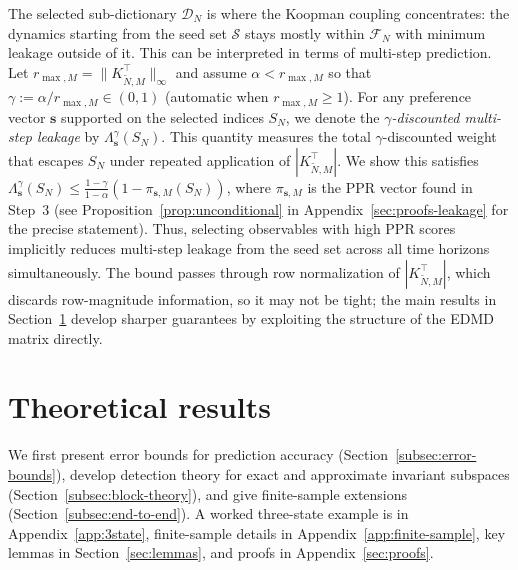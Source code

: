 \documentclass{article}
\theoremstyle{plain}
\theoremstyle{definition}
\def\tp{\intercal}
\def\Fc{\mathcal{F}}
\def\Dc{\mathcal{D}}
\begin{document}
	The selected sub-dictionary $\Dc_N$ is where the Koopman coupling concentrates: the dynamics starting from the seed set $\mathcal{S}$ stays mostly within $\Fc_N$ with minimum leakage outside of it. 
	This can be interpreted in terms of multi-step prediction. 
	Let $r_{\max,M} = \|K_{\tilde{N},M}^{\tp}\|_\infty$ and assume $\alpha < r_{\max,M}$ so that $\gamma := \alpha/r_{\max,M} \in (0,1)$ (automatic when $r_{\max,M} \geq 1$). For any preference vector $\mathbf{s}$ supported on the selected indices $S_N$, we denote the \emph{$\gamma$-discounted multi-step leakage} by $\Lambda_{\mathbf{s}}^{\gamma}(S_N)$. This quantity measures the total $\gamma$-discounted weight that escapes $S_N$ under repeated application of $|K_{\tilde{N},M}^{\tp}|$. We show this satisfies
	$\Lambda_{\mathbf{s}}^{\gamma}(S_N) \leq \frac{1-\gamma}{1-\alpha}(1 - \pi_{\mathbf{s}, M}(S_N))$,
	where $\pi_{\mathbf{s},M}$ is the PPR vector found in Step~3 (see Proposition~\ref{prop:unconditional} in Appendix~\ref{sec:proofs-leakage} for the precise statement). Thus, selecting observables with high PPR scores implicitly reduces multi-step leakage from the seed set across all time horizons simultaneously. The bound passes through row normalization of $|K_{\tilde{N},M}^{\tp}|$, which discards row-magnitude information, so it may not be tight; the main results in Section~\ref{sec:main-results} develop sharper guarantees by exploiting the structure of the EDMD matrix directly.
	\vspace{-0.2cm}
	\section{Theoretical results}\label{sec:main-results}
	\vspace{-0.3cm}
	We first present error bounds for prediction accuracy (Section~\ref{subsec:error-bounds}), develop detection theory for exact and approximate invariant subspaces (Section~\ref{subsec:block-theory}), and give finite-sample extensions (Section~\ref{subsec:end-to-end}). A worked three-state example is in Appendix~\ref{app:3state}, finite-sample details in Appendix~\ref{app:finite-sample}, key lemmas in Section~\ref{sec:lemmas}, and proofs in Appendix~\ref{sec:proofs}.
	
		\vspace{-0.3cm}
\end{document}
